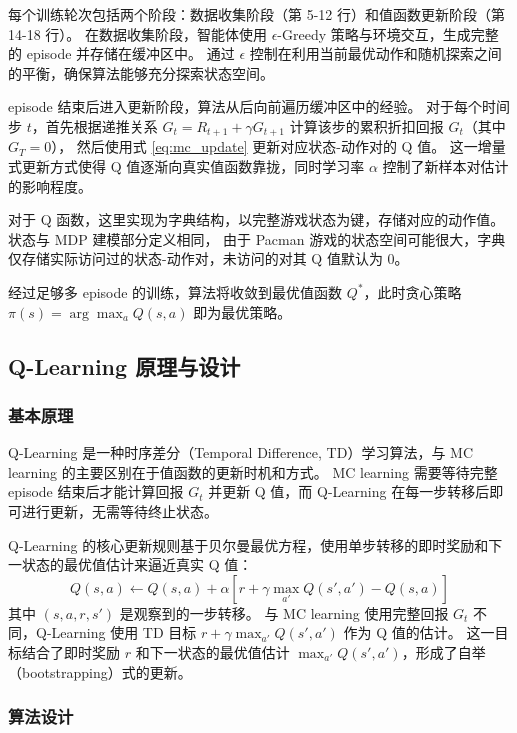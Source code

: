 每个训练轮次包括两个阶段：数据收集阶段（第 5-12 行）和值函数更新阶段（第 14-18 行）。
在数据收集阶段，智能体使用 $\epsilon$-Greedy 策略与环境交互，生成完整的 episode 并存储在缓冲区中。
通过 $\epsilon$ 控制在利用当前最优动作和随机探索之间的平衡，确保算法能够充分探索状态空间。

episode 结束后进入更新阶段，算法从后向前遍历缓冲区中的经验。
对于每个时间步 $t$，首先根据递推关系 $G_t = R_{t+1} + \gamma G_{t+1}$ 计算该步的累积折扣回报 $G_t$（其中 $G_T = 0$），
然后使用式 \eqref{eq:mc_update} 更新对应状态-动作对的 Q 值。
这一增量式更新方式使得 Q 值逐渐向真实值函数靠拢，同时学习率 $\alpha$ 控制了新样本对估计的影响程度。

对于 Q 函数，这里实现为字典结构，以完整游戏状态为键，存储对应的动作值。
状态与 MDP 建模部分定义相同，
由于 Pacman 游戏的状态空间可能很大，字典仅存储实际访问过的状态-动作对，未访问的对其 Q 值默认为 0。

经过足够多 episode 的训练，算法将收敛到最优值函数 $Q^*$，此时贪心策略 $\pi(s) = \arg\max_a Q(s,a)$ 即为最优策略。



\subsection{Q-Learning 原理与设计}

\subsubsection{基本原理}

Q-Learning 是一种时序差分（Temporal Difference, TD）学习算法，与 MC learning 的主要区别在于值函数的更新时机和方式。
MC learning 需要等待完整 episode 结束后才能计算回报 $G_t$ 并更新 Q 值，而 Q-Learning 在每一步转移后即可进行更新，无需等待终止状态。

Q-Learning 的核心更新规则基于贝尔曼最优方程，使用单步转移的即时奖励和下一状态的最优值估计来逼近真实 Q 值：
\begin{equation}
    \label{eq:q_learning_update}
    Q(s,a) \leftarrow Q(s,a) + \alpha \left[ r + \gamma \max_{a'} Q(s', a') - Q(s,a) \right]
\end{equation}
其中 $(s, a, r, s')$ 是观察到的一步转移。
与 MC learning 使用完整回报 $G_t$ 不同，Q-Learning 使用 TD 目标 $r + \gamma \max_{a'} Q(s', a')$ 作为 Q 值的估计。
这一目标结合了即时奖励 $r$ 和下一状态的最优值估计 $\max_{a'} Q(s', a')$，形成了自举（bootstrapping）式的更新。


\subsubsection{算法设计}

